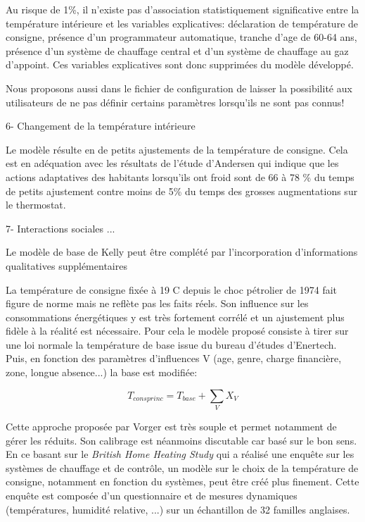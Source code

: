 Au risque de 1\%, il n'existe pas d'association statistiquement significative entre la température intérieure et les variables explicatives: déclaration de température de consigne, présence d'un programmateur automatique, tranche d'age de 60-64 ans, présence d'un système de chauffage central et d'un système de chauffage au gaz d'appoint. Ces variables explicatives sont donc supprimées du modèle développé.

Nous proposons aussi dans le fichier de configuration de laisser la possibilité aux utilisateurs de ne pas définir certains paramètres lorsqu'ils ne sont pas connus!

6- Changement de la température intérieure

\cite{Fabi-13}
Le modèle résulte en de petits ajustements de la température de consigne. Cela est en adéquation avec les résultats de l'étude d'Andersen \cite{Andersen-09} qui indique que les actions adaptatives des habitants lorsqu'ils ont froid sont de 66 à 78 \% du temps de petits ajustement contre moins de 5\% du temps des grosses augmentations sur le thermostat.

7- Interactions sociales ...

Le modèle de base de Kelly peut être complété par l'incorporation d'informations qualitatives supplémentaires

La température de consigne fixée à 19 \degre C depuis le choc pétrolier de 1974 fait figure de norme mais ne reflète pas les faits réels. Son influence sur les consommations énergétiques y est très fortement corrélé et un ajustement plus fidèle à la réalité est nécessaire.
Pour cela le modèle proposé consiste à tirer sur une loi normale la température de base issue du bureau d'études d'Enertech. Puis, en fonction des paramètres d'influences V (age, genre, charge financière, zone, longue absence...) la base est modifiée:

\[T_{consprinc}=T_{base}+\sum_{V}X_{V}\]

Cette approche proposée par Vorger \cite{Vorger-14} est très souple et permet notamment de gérer les réduits. Son calibrage est néanmoins discutable car basé sur le bon sens. En ce basant sur le \textit{British Home Heating Study} qui a réalisé une enquête sur les systèmes de chauffage et de contrôle, un modèle sur le choix de la température de consigne, notamment en fonction du systèmes, peut être créé plus finement. Cette enquête est composée d'un questionnaire et de mesures dynamiques (températures, humidité relative, ...) sur un échantillon de 32 familles anglaises.

